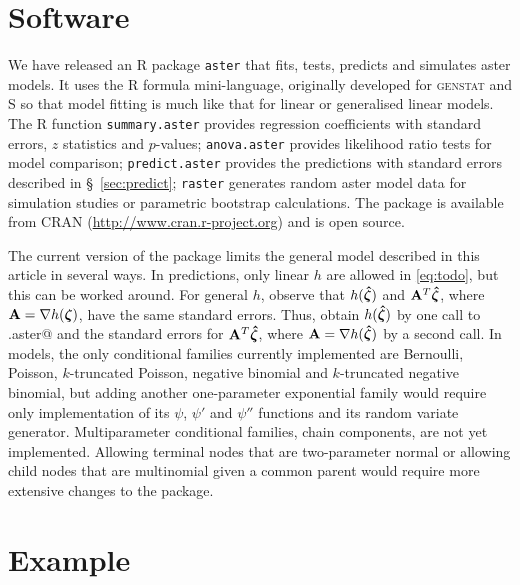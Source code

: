 \section{Software} \label{sec:soft}

We have released an R
\citep{rcore} package \texttt{aster} that fits, tests, predicts
and simulates aster
models.  It uses the R formula mini-language, originally developed for
\textsc{genstat} and S \citep{war,cha} so that model fitting is much like
that for linear or
generalised linear models.  The R function \texttt{summary.aster}
provides regression coefficients with standard errors, $z$ statistics
and $p$-values; \texttt{anova.aster} provides likelihood ratio tests
for model comparison; \texttt{predict.aster} provides
the predictions with standard errors described in \S~\ref{sec:predict};
\texttt{raster} generates random aster model data for
simulation studies or parametric bootstrap calculations.
The package is available from CRAN (\url{http://www.cran.r-project.org})
and is open source.

The current version of the package limits
the general model described in this article in several ways.
In predictions, only linear $h$ are allowed in \eqref{eq:todo},
but this can be worked around.
For general $h$, observe that $h({\boldsymbol{\hat{\zeta}}})$ and $\mathbf{A}^T {\boldsymbol{\hat{\zeta}}}$,
where $\mathbf{A} = \nabla h({\boldsymbol{\zeta}})$, have the same standard errors.
Thus, obtain $h({\boldsymbol{\hat{\zeta}}})$ by one call to \verb@predict.aster@
and the standard errors for $\mathbf{A}^T {\boldsymbol{\hat{\zeta}}}$,
where $\mathbf{A} = \nabla h({\boldsymbol{\hat{\zeta}}})$ by a second call.
In models, the only conditional families currently implemented are
Bernoulli, Poisson, $k$-truncated Poisson, negative binomial
and $k$-truncated negative binomial, but
adding another one-parameter exponential family would require only
implementation of its $\psi$, $\psi'$ and $\psi''$ functions
and its random variate generator.
Multiparameter conditional families, chain components, are not yet implemented.
Allowing terminal nodes that are two-parameter normal
or allowing child nodes that are multinomial given a common parent
would require more extensive changes to the package.

\section{Example} \label{sec:example}

